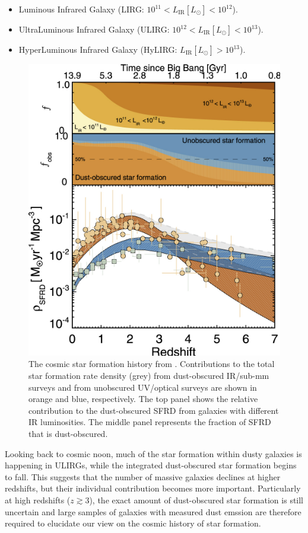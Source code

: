 \begin{itemize}
    \item Luminous Infrared Galaxy (LIRG: $10^{11} < L_\textrm{IR} [L_\odot] < 10^{12}$).
    \item UltraLuminous Infrared Galaxy (ULIRG: $10^{12} < L_\textrm{IR} [L_\odot] < 10^{13}$).
    \item HyperLuminous Infrared Galaxy (HyLIRG: $L_\textrm{IR} [L_\odot] > 10^{13}$).
\end{itemize}

\begin{figure}
    \centering
	\includegraphics[width=0.8\columnwidth]{Figures/cosmic_sfrd.pdf}
	\caption[Cosmic star formation history]{The cosmic star formation history from \citealt{Zavala_2021}. Contributions to the total star formation rate density (grey) from dust-obscured IR/sub-mm surveys and from unobscured UV/optical surveys are shown in orange and blue, respectively. The top panel shows the relative contribution to the dust-obscured SFRD from galaxies with different IR luminosities. The middle panel represents the fraction of SFRD that is dust-obscured.}
	\label{fig:cosmic_sfrd}
\end{figure}

Looking back to cosmic noon, much of the star formation within dusty galaxies is happening in ULIRGs, while the integrated dust-obscured star formation begins to fall. This suggests that the number of massive galaxies declines at higher redshifts, but their individual contribution becomes more important. Particularly at high redshifts ($z \gtrsim 3$), the exact amount of dust-obscured star formation is still uncertain and  large samples of galaxies with measured dust emssion are therefore required to elucidate our view on the cosmic history of star formation.


